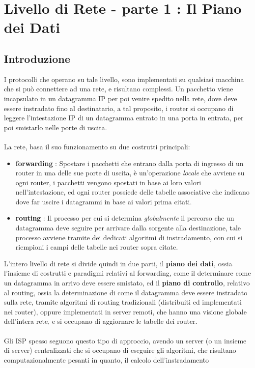 \documentclass[12pt, letterpaper]{article}
\newcommand{\acc}{\\\hphantom{}\\}
\begin{document}
\section{Livello di Rete - parte 1 : Il Piano dei Dati}
\subsection{Introduzione}
I protocolli che operano su tale livello, sono implementati su qualsiasi macchina che si può connettere 
ad una rete, e risultano complessi. Un pacchetto viene incapsulato in un datagramma IP per poi venire spedito 
nella rete, dove deve essere instradato fino al destinatario, a tal proposito, i router si occupano di 
leggere l'intestazione IP di un datagramma entrato in una porta in entrata, per poi smistarlo nelle porte di uscita.\acc 
La rete, basa il suo funzionamento su due costrutti principali:\begin{itemize}
    \item \textbf{forwarding} : Spostare i pacchetti che entrano dalla porta di ingresso di un router in 
    una delle sue porte di uscita, è un'operazione \textit{locale} che avviene su ogni router, i pacchetti vengono spostati 
    in base ai loro valori nell'intestazione, ed ogni router possiede delle tabelle associative che indicano dove 
    far uscire i datagrammi in base ai valori prima citati. 
    \item \textbf{routing} : Il processo per cui si determina \textit{globalmente} il percorso che un datagramma 
    deve seguire per arrivare dalla sorgente alla destinazione, tale processo avviene tramite dei dedicati 
    algoritmi di instradamento, con cui si riempioni i campi delle tabelle nei router sopra citate.
\end{itemize}
L'intero livello di rete si divide quindi in due parti, il \textbf{piano dei dati}, ossia l'insieme di costrutti e 
paradigmi relativi al forwarding, come il determinare come un datagramma in arrivo deve essere smistato, ed il 
\textbf{piano di controllo}, relativo al routing, ossia la determinazione di come il datagramma deve essere 
instradato sulla rete, tramite algoritmi di routing tradizionali (distribuiti ed implementati nei router), oppure 
implementati in server remoti, che hanno una visione globale dell'intera rete, e si occupano di aggiornare le
tabelle dei router.\acc Gli ISP spesso seguono questo tipo di approccio, avendo un server (o un insieme di server) centralizzati 
che si occupano di eseguire gli algoritmi, che risultano computazionalmente pesanti in quanto, il calcolo dell'instradamento 
\end{document}
